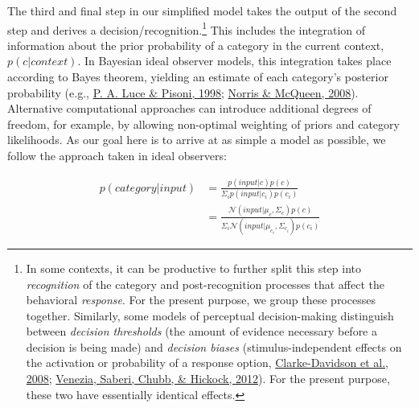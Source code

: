\documentclass[
  11pt,
  man,floatsintext]{apa6}
\begin{document}
The third and final step in our simplified model takes the output of the second step and derives a decision/recognition.\footnote{In some contexts, it can be productive to further split this step into \emph{recognition} of the category and post-recognition processes that affect the behavioral \emph{response}. For the present purpose, we group these processes together. Similarly, some models of perceptual decision-making distinguish between \emph{decision thresholds} (the amount of evidence necessary before a decision is being made) and \emph{decision biases} (stimulus-independent effects on the activation or probability of a response option, \protect\hyperlink{ref-clarkedavidson2008}{Clarke-Davidson et al., 2008}; \protect\hyperlink{ref-venezia2012}{Venezia, Saberi, Chubb, \& Hickock, 2012}). For the present purpose, these two have essentially identical effects.} This includes the integration of information about the prior probability of a category in the current context, \(p(c | context)\). In Bayesian ideal observer models, this integration takes place according to Bayes theorem, yielding an estimate of each category's posterior probability (e.g., \protect\hyperlink{ref-luce-pisoni1998}{P. A. Luce \& Pisoni, 1998}; \protect\hyperlink{ref-norris-mcqueen2008}{Norris \& McQueen, 2008}). Alternative computational approaches can introduce additional degrees of freedom, for example, by allowing non-optimal weighting of priors and category likelihoods. As our goal here is to arrive at as simple a model as possible, we follow the approach taken in ideal observers:

\begin{equation}\label{eq:posterior-probability}
\begin{split}
p(category | input) & = \frac{p(input | c) p(c)}{\Sigma_i p(input | c_i) p(c_i)} \\
                    & = \frac{\mathcal{N}\!(input | \mu_c, \Sigma_c) p(c)}{\Sigma_i \mathcal{N}\!(input | \mu_{c_i}, \Sigma_{c_i}) p(c_i)}
\end{split}
\end{equation}
\end{document}
